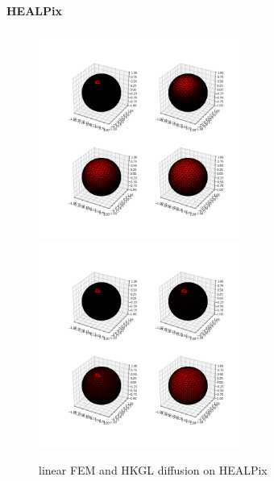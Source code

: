 \paragraph{HEALPix}
\begin{figure}[h]
	\label{fig:FEM and graph diffusion on HEALPix}
	\caption{linear FEM and HKGL diffusion on HEALPix}
	\centering
	\includegraphics[width=0.6\textwidth]{../codes/03.FEM_laplacian/HEALPix/17_diffusion_img/FEM_diffusion.png}
	\includegraphics[width=0.6\textwidth]{../codes/03.FEM_laplacian/HEALPix/17_diffusion_img/GRAPH_diffusion.png}	
\end{figure}
